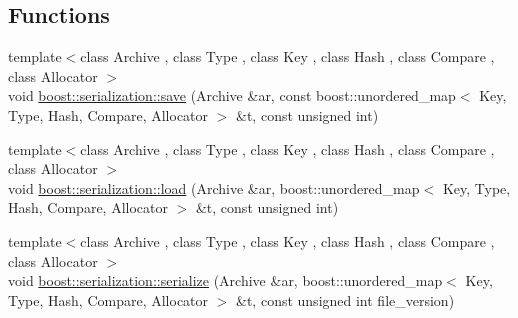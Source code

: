 \subsection*{Functions}
\begin{DoxyCompactItemize}
\item 
{\footnotesize template$<$class Archive , class Type , class Key , class Hash , class Compare , class Allocator $>$ }\\void \hyperlink{namespaceboost_1_1serialization_a04a81556a5eda4b2ee2aea89fa8bacab}{boost\+::serialization\+::save} (Archive \&ar, const boost\+::unordered\+\_\+map$<$ Key, Type, Hash, Compare, Allocator $>$ \&t, const unsigned int)
\item 
{\footnotesize template$<$class Archive , class Type , class Key , class Hash , class Compare , class Allocator $>$ }\\void \hyperlink{namespaceboost_1_1serialization_a8d4be56406f8947db1a1accf28c7e046}{boost\+::serialization\+::load} (Archive \&ar, boost\+::unordered\+\_\+map$<$ Key, Type, Hash, Compare, Allocator $>$ \&t, const unsigned int)
\item 
{\footnotesize template$<$class Archive , class Type , class Key , class Hash , class Compare , class Allocator $>$ }\\void \hyperlink{namespaceboost_1_1serialization_a38423d04b011754810c08d6e599f4789}{boost\+::serialization\+::serialize} (Archive \&ar, boost\+::unordered\+\_\+map$<$ Key, Type, Hash, Compare, Allocator $>$ \&t, const unsigned int file\+\_\+version)
\end{DoxyCompactItemize}
